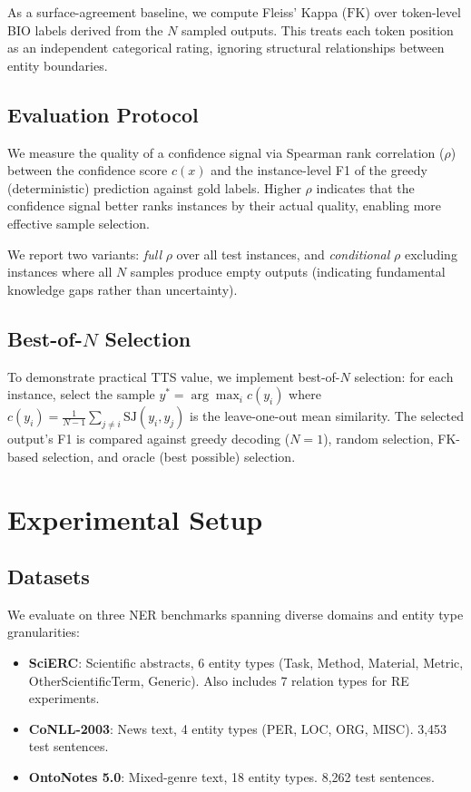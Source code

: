 \documentclass[11pt,a4paper]{article}
\newcommand{\SJ}{\mathrm{SJ}}
\newcommand{\FK}{\mathrm{FK}}
\begin{document}
As a surface-agreement baseline, we compute Fleiss' Kappa ($\FK$) over token-level BIO labels derived from the $N$ sampled outputs. This treats each token position as an independent categorical rating, ignoring structural relationships between entity boundaries.

\subsection{Evaluation Protocol}

We measure the quality of a confidence signal via Spearman rank correlation ($\rho$) between the confidence score $c(x)$ and the instance-level F1 of the greedy (deterministic) prediction against gold labels. Higher $\rho$ indicates that the confidence signal better ranks instances by their actual quality, enabling more effective sample selection.

We report two variants: \emph{full} $\rho$ over all test instances, and \emph{conditional} $\rho$ excluding instances where all $N$ samples produce empty outputs (indicating fundamental knowledge gaps rather than uncertainty).

\subsection{Best-of-$N$ Selection}

To demonstrate practical TTS value, we implement best-of-$N$ selection: for each instance, select the sample $y^* = \arg\max_i c(y_i)$ where $c(y_i) = \frac{1}{N-1}\sum_{j \neq i} \SJ(y_i, y_j)$ is the leave-one-out mean similarity. The selected output's F1 is compared against greedy decoding ($N\!=\!1$), random selection, FK-based selection, and oracle (best possible) selection.

\section{Experimental Setup}

\subsection{Datasets}

We evaluate on three NER benchmarks spanning diverse domains and entity type granularities:
\begin{itemize}
    \item \textbf{SciERC}: Scientific abstracts, 6 entity types (Task, Method, Material, Metric, OtherScientificTerm, Generic). Also includes 7 relation types for RE experiments.
    \item \textbf{CoNLL-2003}: News text, 4 entity types (PER, LOC, ORG, MISC). 3{,}453 test sentences.
    \item \textbf{OntoNotes 5.0}: Mixed-genre text, 18 entity types. 8{,}262 test sentences.
\end{itemize}
\end{document}
